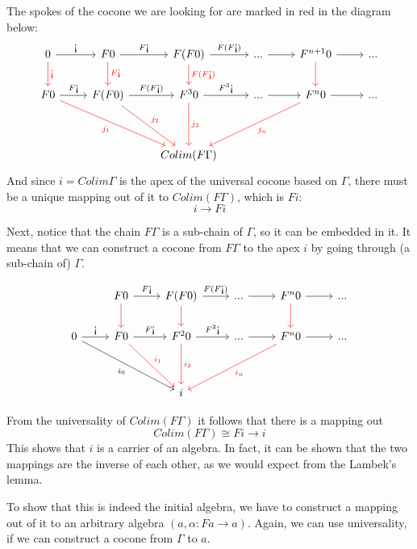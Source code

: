 \documentclass[DaoFP]{subfiles}
\begin{document}
The spokes of the cocone we are looking for are marked in red in the diagram below:
\[
 \begin{tikzcd}
 0
 \arrow[r, "\mbox{!`}"]
 \arrow[d, red, "\mbox{!`}"]
 & F 0
  \arrow[r, "F\mbox{!`}"]
  \arrow[d, red, "F\mbox{!`}"]
& F (F 0)
  \arrow[r, "F(F\mbox{!`})"]
  \arrow[d, red, "F(F\mbox{!`})"]
 & ...
 \arrow[r]
 & F^{n+1} 0
  \arrow[r]
  \arrow[d, red]
 & ...
 \\
 F 0
 \arrow[r, "F \mbox{!`}"]
 \arrow[ddrr, red, "j_1"']
 &  F (F 0)
  \arrow[r, "F(F  \mbox{!`})"]
 \arrow[ddr, red, "j_2"]
& F^3 0
  \arrow[r, "F^3\mbox{!`}"]
  \arrow[dd, red, "j_3"]
 & ...
 \arrow[r]
 & F^n 0
  \arrow[r]
 \arrow[ddll, red, "j_n"]
 & ...
 \\
 \\
 &&Colim (F \Gamma)
  \end{tikzcd}
\]
And since $i = Colim \Gamma$ is the apex of the universal cocone based on $\Gamma$, there must be a unique mapping out of it to $Colim (F \Gamma)$, which is $F i$:
\[ i \to F i \]

Next, notice that the chain $F \Gamma$ is a sub-chain of $\Gamma$, so it can be embedded in it. It means that we can construct a cocone from $F \Gamma$ to the apex $i$ by going through (a sub-chain of) $\Gamma$. 

\[
 \begin{tikzcd}
 & F 0
  \arrow[r, "F\mbox{!`}"]
  \arrow[d, red]
& F (F 0)
  \arrow[r, "F(F\mbox{!`})"]
  \arrow[d, red]
 & ...
 \arrow[r]
 & F^{n} 0
  \arrow[r]
  \arrow[d, red]
 & ...
 \\
  0
 \arrow[r, "\mbox{!`}"]
 \arrow[ddrr,  "i_0"']
 &  F 0
  \arrow[r, "F  \mbox{!`}"]
 \arrow[ddr, red, "i_1"]
& F^2 0
  \arrow[r, "F^2\mbox{!`}"]
  \arrow[dd, red, "i_2"]
 & ...
 \arrow[r]
 & F^n 0
  \arrow[r]
 \arrow[ddll, red, "i_n"]
 & ...
 \\
 \\
 &&i
  \end{tikzcd}
\]


From the universality of $Colim (F \Gamma)$ it follows that there is a mapping out 
\[Colim (F \Gamma) \cong F i \to i \]
This shows that $i$ is a carrier of an algebra. In fact, it can be shown that the two mappings are the inverse of each other, as we would expect from the Lambek's lemma.

To show that this is indeed the initial algebra, we have to construct a mapping out of it to an arbitrary algebra $(a, \alpha \colon F a \to a)$. Again, we can use universality, if we can construct a cocone from $\Gamma$ to $a$. 
\end{document}
